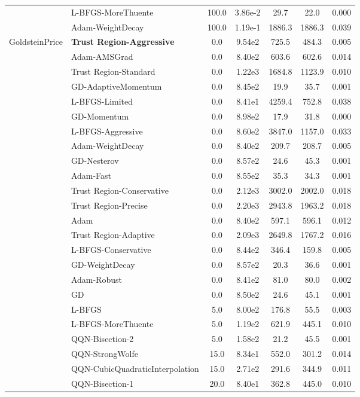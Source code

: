 \documentclass{article}
\begin{document}
\begin{table}[htbp]
{\begin{tabular}{p{2.5cm}p{2.5cm}*{5}{c}}
 & L-BFGS-MoreThuente & 100.0 & 3.86e-2 & 29.7 & 22.0 & 0.000 \\
 & Adam-WeightDecay & 100.0 & 1.19e-1 & 1886.3 & 1886.3 & 0.039 \\
\midrule
\multirow{25}{*}{GoldsteinPrice} & \textbf{Trust Region-Aggressive} & 0.0 & 9.54e2 & 725.5 & 484.3 & 0.005 \\
 & Adam-AMSGrad & 0.0 & 8.40e2 & 603.6 & 602.6 & 0.014 \\
 & Trust Region-Standard & 0.0 & 1.22e3 & 1684.8 & 1123.9 & 0.010 \\
 & GD-AdaptiveMomentum & 0.0 & 8.45e2 & 19.9 & 35.7 & 0.001 \\
 & L-BFGS-Limited & 0.0 & 8.41e1 & 4259.4 & 752.8 & 0.038 \\
 & GD-Momentum & 0.0 & 8.98e2 & 17.9 & 31.8 & 0.000 \\
 & L-BFGS-Aggressive & 0.0 & 8.60e2 & 3847.0 & 1157.0 & 0.033 \\
 & Adam-WeightDecay & 0.0 & 8.40e2 & 209.7 & 208.7 & 0.005 \\
 & GD-Nesterov & 0.0 & 8.57e2 & 24.6 & 45.3 & 0.001 \\
 & Adam-Fast & 0.0 & 8.55e2 & 35.3 & 34.3 & 0.001 \\
 & Trust Region-Conservative & 0.0 & 2.12e3 & 3002.0 & 2002.0 & 0.018 \\
 & Trust Region-Precise & 0.0 & 2.20e3 & 2943.8 & 1963.2 & 0.018 \\
 & Adam & 0.0 & 8.40e2 & 597.1 & 596.1 & 0.012 \\
 & Trust Region-Adaptive & 0.0 & 2.09e3 & 2649.8 & 1767.2 & 0.016 \\
 & L-BFGS-Conservative & 0.0 & 8.44e2 & 346.4 & 159.8 & 0.005 \\
 & GD-WeightDecay & 0.0 & 8.57e2 & 20.3 & 36.6 & 0.001 \\
 & Adam-Robust & 0.0 & 8.41e2 & 81.0 & 80.0 & 0.002 \\
 & GD & 0.0 & 8.50e2 & 24.6 & 45.1 & 0.001 \\
 & L-BFGS & 5.0 & 8.00e2 & 176.8 & 55.5 & 0.003 \\
 & L-BFGS-MoreThuente & 5.0 & 1.19e2 & 621.9 & 445.1 & 0.010 \\
 & QQN-Bisection-2 & 5.0 & 1.58e2 & 21.2 & 45.5 & 0.001 \\
 & QQN-StrongWolfe & 15.0 & 8.34e1 & 552.0 & 301.2 & 0.014 \\
 & QQN-CubicQuadraticInterpolation & 15.0 & 2.71e2 & 291.6 & 344.9 & 0.011 \\
 & QQN-Bisection-1 & 20.0 & 8.40e1 & 362.8 & 445.0 & 0.010 \\

\end{tabular}}
\end{table}
\end{document}
